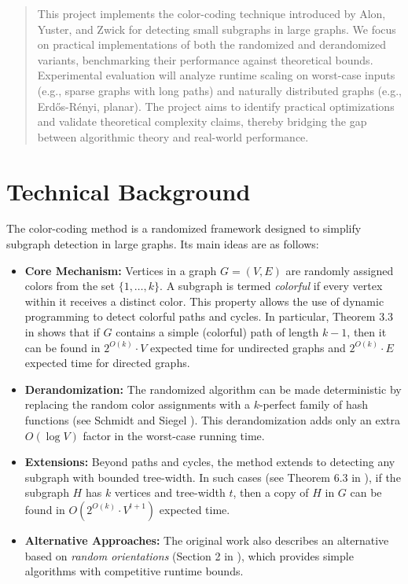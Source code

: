 \maketitle

\begin{abstract}
This project implements the color-coding technique introduced by Alon, Yuster, and Zwick \cite{alon1995color} for detecting small subgraphs in large graphs. We focus on practical implementations of both the randomized and derandomized variants, benchmarking their performance against theoretical bounds. Experimental evaluation will analyze runtime scaling on worst-case inputs (e.g., sparse graphs with long paths) and naturally distributed graphs (e.g., Erd\H{o}s-R\'enyi, planar). The project aims to identify practical optimizations and validate theoretical complexity claims, thereby bridging the gap between algorithmic theory and real-world performance.
\end{abstract}

\section{Technical Background}
The color-coding method \cite{alon1995color} is a randomized framework designed to simplify subgraph detection in large graphs. Its main ideas are as follows:
\begin{itemize}
    \item \textbf{Core Mechanism:} Vertices in a graph \(G = (V, E)\) are randomly assigned colors from the set \(\{1,\dots,k\}\). A subgraph is termed \emph{colorful} if every vertex within it receives a distinct color. This property allows the use of dynamic programming to detect colorful paths and cycles. In particular, Theorem 3.3 in \cite{alon1995color} shows that if \(G\) contains a simple (colorful) path of length \(k-1\), then it can be found in \(2^{O(k)}\cdot V\) expected time for undirected graphs and \(2^{O(k)}\cdot E\) expected time for directed graphs.
    
    \item \textbf{Derandomization:} The randomized algorithm can be made deterministic by replacing the random color assignments with a \(k\)-perfect family of hash functions (see Schmidt and Siegel \cite{schmidt1990spatial}). This derandomization adds only an extra \(O(\log V)\) factor in the worst-case running time.
    
    \item \textbf{Extensions:} Beyond paths and cycles, the method extends to detecting any subgraph with bounded tree-width. In such cases (see Theorem 6.3 in \cite{alon1995color}), if the subgraph \(H\) has \(k\) vertices and tree-width \(t\), then a copy of \(H\) in \(G\) can be found in \(O(2^{O(k)}\cdot V^{t+1})\) expected time.
    
    \item \textbf{Alternative Approaches:} The original work also describes an alternative based on \emph{random orientations} (Section 2 in \cite{alon1995color}), which provides simple algorithms with competitive runtime bounds.
\end{itemize}

